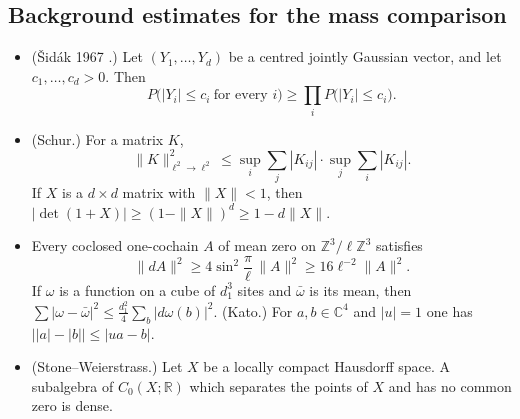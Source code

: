 \documentclass[11pt,letterpaper,reqno]{amsart}
\theoremstyle{definition}
\begin{document}
\subsection{Background estimates for the mass comparison}
\begin{itemize}
\item[(K22)] (\v{S}id\'ak 1967 \cite{Sidak1967}.)
Let $(Y_1,\dots,Y_d)$ be a centred jointly Gaussian vector, and let $c_1,\dots,c_d>0$.
Then
\begin{equation*}
P\bigl(|Y_i|\le c_i\ \text{for every }i\bigr)\ge\prod_iP\bigl(|Y_i|\le c_i\bigr).
\end{equation*}
\item[(K23)] (Schur.)
For a matrix $K$,
\begin{equation*}
\|K\|^2_{\ell^2\to\ell^2}\le\sup_i\sum_j|K_{ij}|\cdot\sup_j\sum_i|K_{ij}|.
\end{equation*}
If $X$ is a $d\times d$ matrix with $\|X\|<1$, then $|\det(1+X)|\ge(1-\|X\|)^d\ge1-d\|X\|$.
\item[(K24)] Every coclosed one-cochain $A$ of mean zero on $\mathbb Z^3/\ell\mathbb Z^3$ satisfies
\begin{equation*}
\|dA\|^2\ge4\sin^2\frac\pi\ell\,\|A\|^2\ge16\ell^{-2}\|A\|^2.
\end{equation*}
If $\omega$ is a function on a cube of $d_1^3$ sites and $\bar\omega$ is its mean, then $\sum|\omega-\bar\omega|^2\le\frac{d_1^2}4\sum_b|d\omega(b)|^2$.
(Kato.) For $a,b\in\mathbb C^4$ and $|u|=1$ one has $\bigl||a|-|b|\bigr|\le|ua-b|$.
\item[(K28)] (Stone--Weierstrass.) Let $X$ be a locally compact Hausdorff space.
A subalgebra of $C_0(X;\mathbb R)$ which separates the points of $X$ and has no common zero is dense.
\end{itemize}
\end{document}

